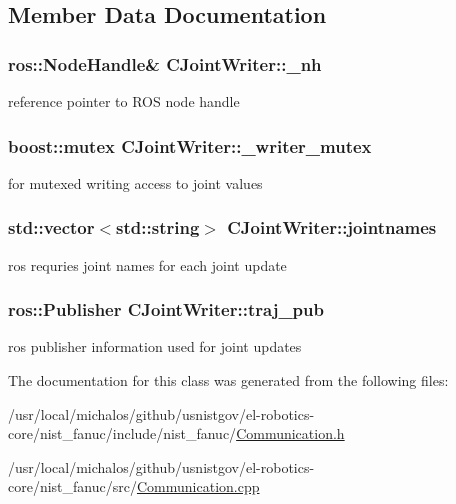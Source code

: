 \subsection{Member Data Documentation}
\hypertarget{classCJointWriter_af65e697d4e7fdfe1f17e16b47ab52817}{
\subsubsection[{\-\_\-nh}]{\setlength{\rightskip}{0pt plus 5cm}ros\-::\-Node\-Handle\& C\-Joint\-Writer\-::\-\_\-nh}}\label{classCJointWriter_af65e697d4e7fdfe1f17e16b47ab52817}
reference pointer to R\-O\-S node handle \hypertarget{classCJointWriter_a1f005dcb6f32e6d161026a6cdda5b66f}{
\subsubsection[{\-\_\-writer\-\_\-mutex}]{\setlength{\rightskip}{0pt plus 5cm}boost\-::mutex C\-Joint\-Writer\-::\-\_\-writer\-\_\-mutex\hspace{0.3cm}{\ttfamily [static]}}}\label{classCJointWriter_a1f005dcb6f32e6d161026a6cdda5b66f}
for mutexed writing access to joint values \hypertarget{classCJointWriter_a3aceb4ba37d60a52c34e486871bc8f58}{
\subsubsection[{jointnames}]{\setlength{\rightskip}{0pt plus 5cm}std\-::vector$<$std\-::string$>$ C\-Joint\-Writer\-::jointnames}}\label{classCJointWriter_a3aceb4ba37d60a52c34e486871bc8f58}
ros requries joint names for each joint update \hypertarget{classCJointWriter_a109841588bf726b430b82a509176bb0c}{
\subsubsection[{traj\-\_\-pub}]{\setlength{\rightskip}{0pt plus 5cm}ros\-::\-Publisher C\-Joint\-Writer\-::traj\-\_\-pub}}\label{classCJointWriter_a109841588bf726b430b82a509176bb0c}
ros publisher information used for joint updates 

The documentation for this class was generated from the following files\-:\begin{DoxyCompactItemize}
\item 
/usr/local/michalos/github/usnistgov/el-\/robotics-\/core/nist\-\_\-fanuc/include/nist\-\_\-fanuc/\hyperlink{Communication_8h}{Communication.\-h}\item 
/usr/local/michalos/github/usnistgov/el-\/robotics-\/core/nist\-\_\-fanuc/src/\hyperlink{Communication_8cpp}{Communication.\-cpp}\end{DoxyCompactItemize}
